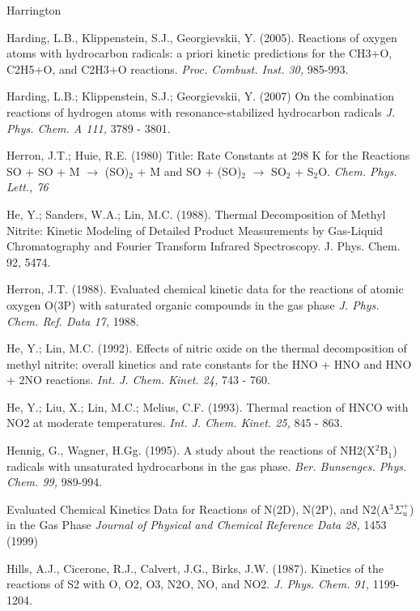 \documentclass[12pt,landscape]{article}
\newcounter{reaction}
\begin{document}
Harrington

Harding, L.B., Klippenstein, S.J., Georgievskii, Y. (2005). Reactions of oxygen atoms with hydrocarbon radicals: a priori kinetic predictions for the CH3+O, C2H5+O, and C2H3+O reactions. {\em Proc. Combust. Inst. 30,} 985-993.

Harding, L.B.; Klippenstein, S.J.; Georgievskii, Y. (2007)
On the combination reactions of hydrogen atoms with resonance-stabilized hydrocarbon radicals
{\em J. Phys. Chem. A 111,} 3789 - 3801.

Herron, J.T.; Huie, R.E. (1980)
Title:   Rate Constants at 298 K for the Reactions SO + SO + M $\rightarrow$ (SO)$_2$ + M and SO + (SO)$_2$ $\rightarrow$ SO$_2$ + S$_2$O.
{\em  Chem. Phys. Lett., 76}

He, Y.; Sanders, W.A.; Lin, M.C. (1988).  Thermal Decomposition of Methyl Nitrite: Kinetic Modeling of Detailed Product Measurements by Gas-Liquid Chromatography and Fourier Transform Infrared Spectroscopy.   J. Phys. Chem. 92, 5474.

Herron, J.T. (1988). Evaluated chemical kinetic data for the reactions of atomic oxygen O(3P) with saturated organic compounds in the gas phase
{\em J. Phys. Chem. Ref. Data 17,} 1988.

He, Y.; Lin, M.C. (1992).   Effects of nitric oxide on the thermal decomposition of methyl nitrite: overall kinetics and rate constants for the HNO + HNO and HNO + 2NO reactions.  {\em Int. J. Chem. Kinet. 24,} 743 - 760.

He, Y.; Liu, X.; Lin, M.C.; Melius, C.F. (1993).  Thermal reaction of HNCO with NO2 at moderate temperatures.  {\em Int. J. Chem. Kinet. 25,} 845 - 863.

Hennig, G., Wagner, H.Gg. (1995). A study about the reactions of NH2(X$^2$B$_1$) radicals with unsaturated hydrocarbons in the gas phase.  {\em Ber. Bunsenges. Phys. Chem. 99,} 989-994.

Evaluated Chemical Kinetics Data for Reactions of N(2D), N(2P), and N2(A$^3\Sigma^+_u$) in the Gas Phase
{\em Journal of Physical and Chemical Reference Data 28,} 1453 (1999)

Hills, A.J., Cicerone, R.J., Calvert, J.G., Birks, J.W. (1987).  Kinetics of the reactions of S2 with O, O2, O3, N2O, NO, and NO2. {\em J. Phys. Chem. 91,} 1199-1204.
\end{document}
